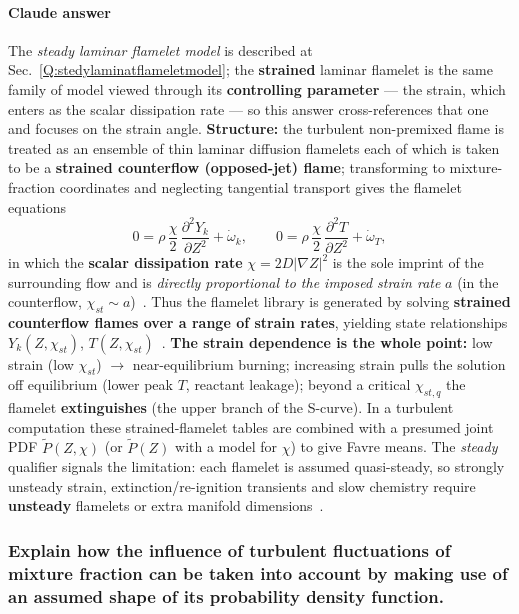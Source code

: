 {\color{istblue}
\paragraph{Claude answer}
The \emph{steady laminar flamelet model} is described at Sec.~\ref{Q:stedylaminatflameletmodel}; the \textbf{strained} laminar flamelet is the same family of model viewed through its \textbf{controlling parameter} --- the strain, which enters as the scalar dissipation rate --- so this answer cross-references that one and focuses on the strain angle. \textbf{Structure:} the turbulent non-premixed flame is treated as an ensemble of thin laminar diffusion flamelets each of which is taken to be a \textbf{strained counterflow (opposed-jet) flame}; transforming to mixture-fraction coordinates and neglecting tangential transport gives the flamelet equations
\begin{equation*}
0 = \rho\,\frac{\chi}{2}\,\frac{\partial^2 Y_k}{\partial Z^2} + \dot\omega_k, \qquad 0 = \rho\,\frac{\chi}{2}\,\frac{\partial^2 T}{\partial Z^2} + \dot\omega_T,
\end{equation*}
in which the \textbf{scalar dissipation rate} $\chi = 2D|\nabla Z|^2$ is the sole imprint of the surrounding flow and is \emph{directly proportional to the imposed strain rate} $a$ (in the counterflow, $\chi_{st}\sim a$)~\cite{lecture9,peters2000turbulent,poinsot2012theoretical}. Thus the flamelet library is generated by solving \textbf{strained counterflow flames over a range of strain rates}, yielding state relationships $Y_k(Z,\chi_{st})$, $T(Z,\chi_{st})$~\cite{lecture9,Law1988}. \textbf{The strain dependence is the whole point:} low strain (low $\chi_{st}$) $\to$ near-equilibrium burning; increasing strain pulls the solution off equilibrium (lower peak $T$, reactant leakage); beyond a critical $\chi_{st,q}$ the flamelet \textbf{extinguishes} (the upper branch of the S-curve). In a turbulent computation these strained-flamelet tables are combined with a presumed joint PDF $\tilde P(Z,\chi)$ (or $\tilde P(Z)$ with a model for $\chi$) to give Favre means. The \emph{steady} qualifier signals the limitation: each flamelet is assumed quasi-steady, so strongly unsteady strain, extinction/re-ignition transients and slow chemistry require \textbf{unsteady} flamelets or extra manifold dimensions~\cite{peters2000turbulent,warnatz2006combustion}.
}




\subsubsection{Explain how the influence of turbulent fluctuations of mixture fraction can be taken into account by making use of an assumed shape of its probability density function.}

